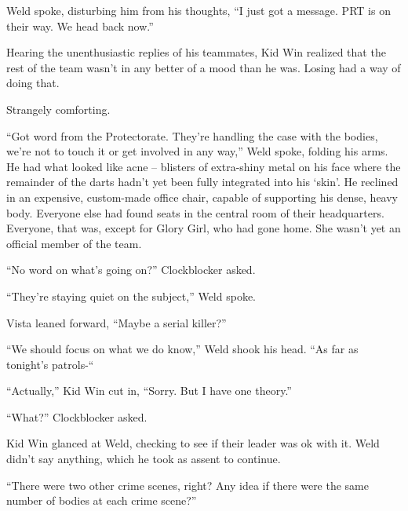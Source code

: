 Weld spoke, disturbing him from his thoughts, ``I just got a message.  PRT is on their way.  We head back now.''



Hearing the unenthusiastic replies of his teammates, Kid Win realized that the rest of the team wasn't in any better of a mood than he was.  Losing had a way of doing that.



Strangely comforting.



\blacksquare



``Got word from the Protectorate.  They're handling the case with the bodies, we're not to touch it or get involved in any way,'' Weld spoke, folding his arms.  He had what looked like acne – blisters of extra-shiny metal on his face where the remainder of the darts hadn't yet been fully integrated into his `skin'.  He reclined in an expensive, custom-made office chair, capable of supporting his dense, heavy body.  Everyone else had found seats in the central room of their headquarters.  Everyone, that was, except for Glory Girl, who had gone home.  She wasn't yet an official member of the team.



``No word on what's going on?'' Clockblocker asked.



``They're staying quiet on the subject,'' Weld spoke.



Vista leaned forward, ``Maybe a serial killer?''



``We should focus on what we do know,'' Weld shook his head. ``As far as tonight's patrols-``



``Actually,'' Kid Win cut in, ``Sorry.  But I have one theory.''



``What?'' Clockblocker asked.



Kid Win glanced at Weld, checking to see if their leader was ok with it.  Weld didn't say anything, which he took as assent to continue.



``There were two other crime scenes, right?  Any idea if there were the same number of bodies at each crime scene?''



